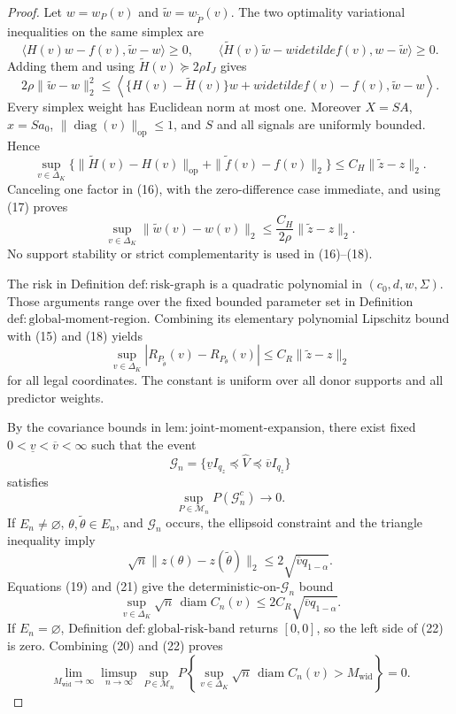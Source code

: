 \documentclass{article}
\begin{document}
\begin{proof}
Let \(w=w_P(v)\) and \(\widetilde w=w_{\widetilde P}(v)\).  The two optimality variational inequalities on the same simplex are
\[
\langle H(v)w-f(v),\widetilde w-w\rangle\geq0,
\qquad
\langle\widetilde H(v)\widetilde w-widetilde f(v),
w-\widetilde w\rangle\geq0.
\]
Adding them and using \(\widetilde H(v)\succeq2\rho I_J\) gives
\[
2\rho\|\widetilde w-w\|_2^2
\leq
\left\langle
\{H(v)-\widetilde H(v)\}w+widetilde f(v)-f(v),
\widetilde w-w
\right\rangle.
\tag{16}
\]
Every simplex weight has Euclidean norm at most one.  Moreover \(X=SA\), \(x=Sa_0\), \(\|\operatorname{diag}(v)\|_{\mathrm{op}}\leq1\), and \(S\) and all signals are uniformly bounded.  Hence
\[
\sup_{v\in\Delta_K}
\{\|\widetilde H(v)-H(v)\|_{\mathrm{op}}
+\|\widetilde f(v)-f(v)\|_2\}
\leq C_H\|\widetilde z-z\|_2.
\tag{17}
\]
Canceling one factor in (16), with the zero-difference case immediate, and using (17) proves
\[
\sup_{v\in\Delta_K}\|\widetilde w(v)-w(v)\|_2
\leq \frac{C_H}{2\rho}\|\widetilde z-z\|_2.
\tag{18}
\]
No support stability or strict complementarity is used in (16)--(18).

The risk in Definition \(\mathrm{def:risk\mbox{-}graph}\) is a quadratic polynomial in \((c_0,d,w,\Sigma)\).  Those arguments range over the fixed bounded parameter set in Definition \(\mathrm{def:global\mbox{-}moment\mbox{-}region}\).  Combining its elementary polynomial Lipschitz bound with (15) and (18) yields
\[
\sup_{v\in\Delta_K}
|R_{P_{\widetilde\theta}}(v)-R_{P_\theta}(v)|
\leq C_R\|\widetilde z-z\|_2
\tag{19}
\]
for all legal coordinates.  The constant is uniform over all donor supports and all predictor weights.

By the covariance bounds in \(\mathrm{lem:joint\mbox{-}moment\mbox{-}expansion}\), there exist fixed \(0<\underline v<\overline v<\infty\) such that the event
\[
\mathcal G_n=
\{\underline v I_{q_z}\preceq\widehat V
\preceq\overline v I_{q_z}\}
\]
satisfies
\[
\sup_{P\in\mathcal M_n}P(\mathcal G_n^c)\longrightarrow0.
\tag{20}
\]
If \(E_n\neq\varnothing\), \(\theta,\widetilde\theta\in E_n\), and \(\mathcal G_n\) occurs, the ellipsoid constraint and the triangle inequality imply
\[
\sqrt n\|z(\theta)-z(\widetilde\theta)\|_2
\leq2\sqrt{\overline v q_{1-\alpha}}.
\tag{21}
\]
Equations (19) and (21) give the deterministic-on-\(\mathcal G_n\) bound
\[
\sup_{v\in\Delta_K}\sqrt n\,
\operatorname{diam}C_n(v)
\leq2C_R\sqrt{\overline v q_{1-\alpha}}.
\tag{22}
\]
If \(E_n=\varnothing\), Definition \(\mathrm{def:global\mbox{-}risk\mbox{-}band}\) returns \([0,0]\), so the left side of (22) is zero.  Combining (20) and (22) proves
\[
\lim_{M_{\mathrm{wid}}\to\infty}
\limsup_{n\to\infty}
\sup_{P\in\mathcal M_n}
P\!\left\{
\sup_{v\in\Delta_K}\sqrt n\,
\operatorname{diam}C_n(v)>M_{\mathrm{wid}}
\right\}=0.
\]


\end{proof}
\end{document}
